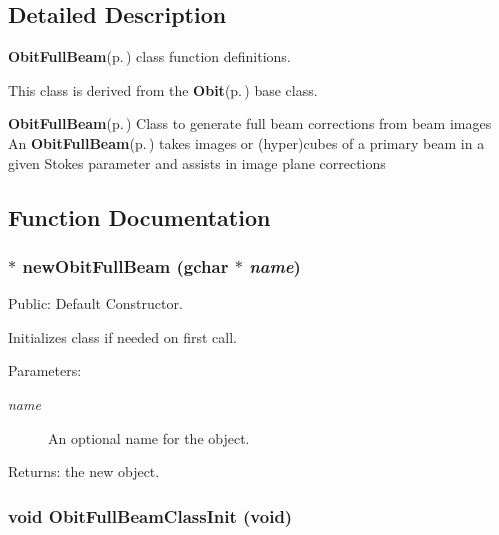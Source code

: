 \subsection{Detailed Description}
{\bf Obit\-Full\-Beam}{\rm (p.\,\pageref{structObitFullBeam})} class function definitions. 

This class is derived from the {\bf Obit}{\rm (p.\,\pageref{structObit})} base class.

{\bf Obit\-Full\-Beam}{\rm (p.\,\pageref{structObitFullBeam})} Class to generate full beam corrections from beam images An {\bf Obit\-Full\-Beam}{\rm (p.\,\pageref{structObitFullBeam})} takes images or (hyper)cubes of a primary beam in a given Stokes parameter and assists in image plane corrections

\subsection{Function Documentation}
\subsubsection{$\ast$ new\-Obit\-Full\-Beam (gchar $\ast$ {\em name})}\label{ObitFullBeam_8c_a7}


Public: Default Constructor. 

Initializes class if needed on first call. \begin{Desc}
\item[Parameters:]
\begin{description}
\item[{\em name}]An optional name for the object. \end{description}
\end{Desc}
\begin{Desc}
\item[Returns:]the new object. \end{Desc}
\subsubsection{\setlength{\rightskip}{0pt plus 5cm}void Obit\-Full\-Beam\-Class\-Init (void)}\label{ObitFullBeam_8c_a16}


